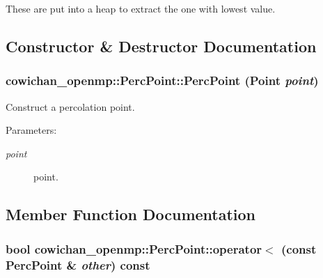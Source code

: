 These are put into a heap to extract the one with lowest value. 

\subsection{Constructor \& Destructor Documentation}
\hypertarget{classcowichan__openmp_1_1_perc_point_81ced481b96424cb9e44c8eb784d00dd}{
\subsubsection[{PercPoint}]{\setlength{\rightskip}{0pt plus 5cm}cowichan\_\-openmp::PercPoint::PercPoint ({\bf Point} {\em point})}}
\label{classcowichan__openmp_1_1_perc_point_81ced481b96424cb9e44c8eb784d00dd}


Construct a percolation point. \begin{Desc}
\item[Parameters:]
\begin{description}
\item[{\em point}]point. \end{description}
\end{Desc}


\subsection{Member Function Documentation}
\hypertarget{classcowichan__openmp_1_1_perc_point_7796aaf1ba591cd821f7f5e89f8f6550}{
\subsubsection[{operator$<$}]{\setlength{\rightskip}{0pt plus 5cm}bool cowichan\_\-openmp::PercPoint::operator$<$ (const {\bf PercPoint} \& {\em other}) const}}
\label{classcowichan__openmp_1_1_perc_point_7796aaf1ba591cd821f7f5e89f8f6550}


